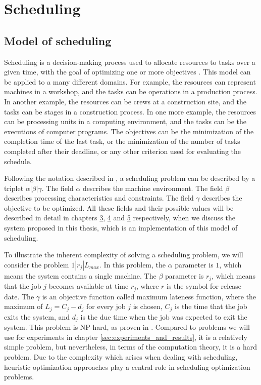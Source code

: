 \section{Scheduling}
\label{sec:scheduling}

\subsection{Model of scheduling}
\label{sec:model_of_scheduling}
Scheduling is a decision-making process used to allocate resources to tasks over a given time, with the goal of optimizing one or more objectives \citep{pinedo2016scheduling}. This model can be applied to a many different domains. For example, the resources can represent machines in a workshop, and the tasks can be operations in a production process. In another example, the resources can be crews at a construction site, and the tasks can be stages in a construction process. In one more example, the resources can be processing units in a computing environment, and the tasks can be the executions of computer programs. The objectives can be the minimization of the completion time of the last task, or the minimization of the number of tasks completed after their deadline, or any other criterion used for evaluating the schedule.

Following the notation described in \citep{pinedo2016scheduling}, a scheduling problem can be described by a triplet $\alpha | \beta | \gamma$. The field $\alpha$ describes the machine environment. The field $\beta$ describes processing characteristics and constraints. The field $\gamma$ describes the objective to be optimized. All these fields and their possible values will be described in detail in chapters \hyperref[sec:topology_model]{3}, \hyperref[sec:events_model]{4} and \hyperref[sec:evaluation_model]{5} respectively, when we discuss the system proposed in this thesis, which is an implementation of this model of scheduling.

To illustrate the inherent complexity of solving a scheduling problem, we will consider the problem $1|r_j|L_{max}$. In this problem, the $\alpha$ parameter is $1$, which means the system contains a single machine. The $\beta$ parameter is $r_j$, which means that the job $j$ becomes available at time $r_j$, where $r$ is the symbol for release date. The $\gamma$ is an objective function called maximum lateness function, where the maximum of $L_j = C_j - d_j$ for every job $j$ is chosen, $C_j$ is the time that the job exits the system, and $d_j$ is the due time when the job was expected to exit the system. This problem is NP-hard, as proven in \citep{pinedo2016scheduling}. Compared to problems we will use for experiments in chapter \ref{sec:experiments_and_results}, it is a relatively simple problem, but nevertheless, in terms of the computation theory, it is a hard problem. Due to the complexity which arises when dealing with scheduling, heuristic optimization approaches play a central role in scheduling optimization problems.

